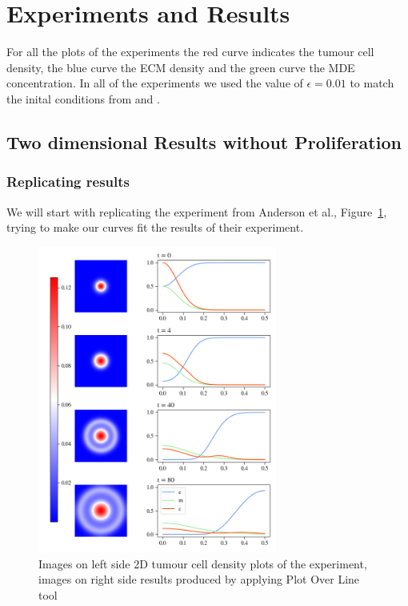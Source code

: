 

\section{Experiments and Results}
For all the plots of the experiments the red curve indicates the tumour cell density, the blue curve the ECM density and the green curve the MDE concentration. In all of the experiments we used the value of $\epsilon = 0.01$ to match the inital conditions from \cite{anderson_mathematical_2000} and \cite{Kolev2010}. \newline 


\subsection{Two dimensional Results without Proliferation}
\subsubsection{Replicating results}
We will start with replicating the experiment from  Anderson et al.\cite{anderson_mathematical_2000}, Figure~\ref{fig:unadjsuted_replication}, trying to make our curves fit the results of their experiment. 


\begin{figure}[h]
    \centering
    \includegraphics[width=0.7\textwidth]{resources/images/first_replication_results.png}
    \caption{Images on left side 2D tumour cell density plots of the experiment, images on right side results produced by applying Plot Over Line tool}
    \label{fig:unadjsuted_replication}
\end{figure}


